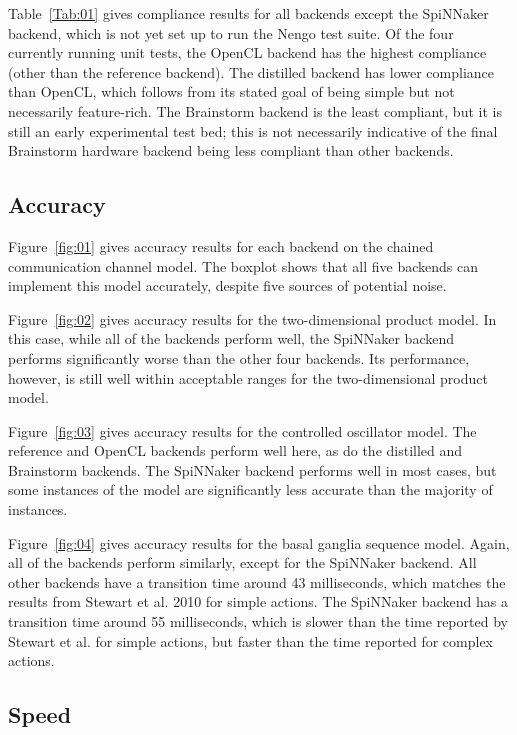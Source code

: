 \documentclass{frontiersSCNS}
\begin{document}
Table~\ref{Tab:01} gives compliance results for
all backends except the SpiNNaker backend,
which is not yet set up to run the Nengo test suite.
Of the four currently running unit tests,
the OpenCL backend has the highest compliance
(other than the reference backend).
The distilled backend has lower compliance
than OpenCL, which follows from its stated goal
of being simple but not necessarily feature-rich.
The Brainstorm backend is the least compliant,
but it is still an early experimental test bed;
this is not necessarily indicative of the
final Brainstorm hardware backend being
less compliant than other backends.

\subsection{Accuracy}

Figure~\ref{fig:01} gives accuracy results
for each backend on the chained communication channel model.
The boxplot shows that all five backends can
implement this model accurately,
despite five sources of potential noise.

Figure~\ref{fig:02} gives accuracy results
for the two-dimensional product model.
In this case, while all of the backends
perform well, the SpiNNaker backend
performs significantly worse than the
other four backends.
Its performance, however, is still well within
acceptable ranges for the two-dimensional product model.

Figure~\ref{fig:03} gives accuracy results
for the controlled oscillator model.
The reference and OpenCL backends perform well here,
as do the distilled and Brainstorm backends.
The SpiNNaker backend performs well in most cases,
but some instances of the model
are significantly less accurate
than the majority of instances.

Figure~\ref{fig:04} gives accuracy results
for the basal ganglia sequence model.
Again, all of the backends perform similarly,
except for the SpiNNaker backend.
All other backends have a transition time
around 43 milliseconds, which matches
the results from Stewart et al. 2010 \cite{???}
for simple actions.
The SpiNNaker backend has a transition time
around 55 milliseconds, which is slower
than the time reported by Stewart et al.
for simple actions, but faster than the
time reported for complex actions.

\subsection{Speed}
\end{document}
